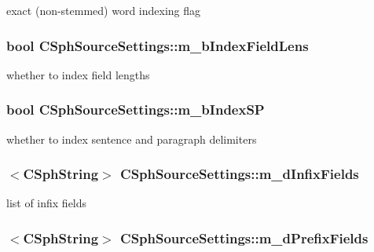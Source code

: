 exact (non-\/stemmed) word indexing flag 

\hypertarget{structCSphSourceSettings_af4604306126cea026fbbb7501db04705}{
\subsubsection[{m\-\_\-b\-Index\-Field\-Lens}]{\setlength{\rightskip}{0pt plus 5cm}bool C\-Sph\-Source\-Settings\-::m\-\_\-b\-Index\-Field\-Lens}}\label{structCSphSourceSettings_af4604306126cea026fbbb7501db04705}


whether to index field lengths 

\hypertarget{structCSphSourceSettings_ad3dbcf24a7c8128b9d7ffab31d37abfe}{
\subsubsection[{m\-\_\-b\-Index\-S\-P}]{\setlength{\rightskip}{0pt plus 5cm}bool C\-Sph\-Source\-Settings\-::m\-\_\-b\-Index\-S\-P}}\label{structCSphSourceSettings_ad3dbcf24a7c8128b9d7ffab31d37abfe}


whether to index sentence and paragraph delimiters 

\hypertarget{structCSphSourceSettings_ad96322074dfdf9a6ddd5b7651ab8a43d}{
\subsubsection[{m\-\_\-d\-Infix\-Fields}]{$<${\bf C\-Sph\-String}$>$ C\-Sph\-Source\-Settings\-::m\-\_\-d\-Infix\-Fields}}\label{structCSphSourceSettings_ad96322074dfdf9a6ddd5b7651ab8a43d}


list of infix fields 

\hypertarget{structCSphSourceSettings_a4abbec39b930428f81fdc07cb3ae10af}{
\subsubsection[{m\-\_\-d\-Prefix\-Fields}]{$<${\bf C\-Sph\-String}$>$ C\-Sph\-Source\-Settings\-::m\-\_\-d\-Prefix\-Fields}}\label{structCSphSourceSettings_a4abbec39b930428f81fdc07cb3ae10af}


